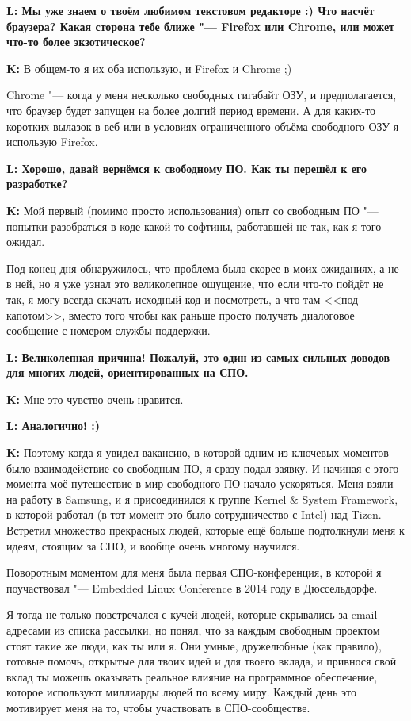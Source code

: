 \documentclass[10pt, a5paper]{article}
\begin{document}
\begin{Parallel}[p]{}{}
{{\noindent \bf L: Мы уже знаем о твоём любимом текстовом редакторе :) Что насчёт браузера? Какая сторона тебе ближе "--- Firefox или Chrome, или может что-то более экзотическое?}

{\noindent \bf K:} В общем-то я их оба использую, и Firefox и Chrome ;)

Chrome "--- когда у меня несколько свободных гигабайт ОЗУ, и предполагается, что браузер будет запущен на более долгий период времени. А для каких-то коротких вылазок в веб или в условиях ограниченного объёма свободного ОЗУ я использую Firefox.

{\noindent \bf L: Хорошо, давай вернёмся к свободному ПО. Как ты перешёл к его разработке?}

{\noindent \bf K:} Мой первый (помимо просто использования) опыт со свободным ПО "--- попытки разобраться в коде какой-то софтины, работавшей не так, как я того ожидал.

Под конец дня обнаружилось, что проблема была скорее в моих ожиданиях, а не в ней, но я уже узнал это великолепное ощущение, что если что-то пойдёт не так, я могу всегда скачать исходный код и посмотреть, а что там <<под капотом>>, вместо того чтобы как раньше просто получать диалоговое сообщение с номером службы поддержки.

{\noindent \bf L: Великолепная причина! Пожалуй, это один из самых сильных доводов для многих людей, ориентированных на СПО.}

{\noindent \bf K:} Мне это чувство очень нравится.

{\noindent \bf L: Аналогично! :) }

{\noindent \bf K:}  Поэтому когда я увидел вакансию, в которой одним из ключевых моментов было взаимодействие со свободным ПО, я сразу подал заявку. И начиная с этого момента моё путешествие в мир свободного ПО начало ускоряться. Меня взяли на работу в Samsung, и я присоединился к группе Kernel \& System Framework, в которой работал (в тот момент это было сотрудничество с Intel) над Tizen.
Встретил множество прекрасных людей, которые ещё больше подтолкнули меня к идеям, стоящим за СПО, и вообще очень многому научился.

Поворотным моментом для меня была первая СПО-\linebreak конференция, в которой я поучаствовал "--- Embedded Linux Conference в 2014 году в Дюссельдорфе.

Я тогда не только повстречался с кучей людей, которые скрывались за email-адресами из списка рассылки, но понял, что за каждым свободным проектом стоят такие же люди, как ты или я.
Они умные, дружелюбные (как правило), готовые помочь, открытые для твоих идей и для твоего вклада, и привнося свой вклад ты можешь оказывать реальное влияние на программное обеспечение, которое используют миллиарды людей по всему миру.
Каждый день это мотивирует меня на то, чтобы участвовать в СПО-сообществе.

}
\end{Parallel}
\end{document}

